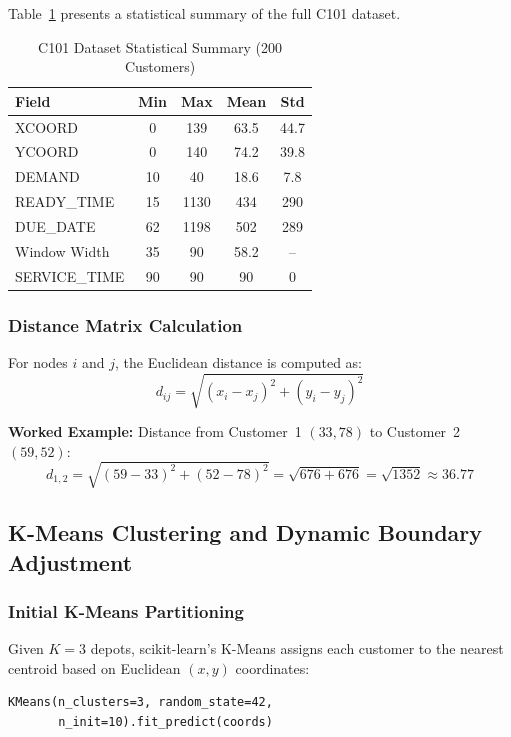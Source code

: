 \documentclass[10pt,conference]{IEEEtran}
\begin{document}
Table~\ref{tab:dataset_stats} presents a statistical summary of the full C101 dataset.

\begin{table}[h]
\caption{C101 Dataset Statistical Summary (200 Customers)}
\label{tab:dataset_stats}
\begin{center}
\begin{tabular}{|l|c|c|c|c|}
\hline
\textbf{Field} & \textbf{Min} & \textbf{Max} & \textbf{Mean} & \textbf{Std} \\
\hline
XCOORD & 0 & 139 & 63.5 & 44.7 \\
YCOORD & 0 & 140 & 74.2 & 39.8 \\
DEMAND & 10 & 40 & 18.6 & 7.8 \\
READY\_TIME & 15 & 1130 & 434 & 290 \\
DUE\_DATE & 62 & 1198 & 502 & 289 \\
Window Width & 35 & 90 & 58.2 & -- \\
SERVICE\_TIME & 90 & 90 & 90 & 0 \\
\hline
\end{tabular}
\end{center}
\end{table}

\subsubsection{Distance Matrix Calculation}
For nodes $i$ and $j$, the Euclidean distance is computed as:
\begin{equation}
    d_{ij} = \sqrt{(x_i - x_j)^2 + (y_i - y_j)^2}
\end{equation}

\textbf{Worked Example:} Distance from Customer~1 $(33, 78)$ to Customer~2 $(59, 52)$:
\begin{equation}
    d_{1,2} = \sqrt{(59-33)^2 + (52-78)^2} = \sqrt{676 + 676} = \sqrt{1352} \approx 36.77
\end{equation}

\subsection{K-Means Clustering and Dynamic Boundary Adjustment}

\subsubsection{Initial K-Means Partitioning}
Given $K=3$ depots, scikit-learn's K-Means assigns each customer to the nearest centroid based on Euclidean $(x, y)$ coordinates:
\begin{verbatim}
KMeans(n_clusters=3, random_state=42,
       n_init=10).fit_predict(coords)
\end{verbatim}
\end{document}
